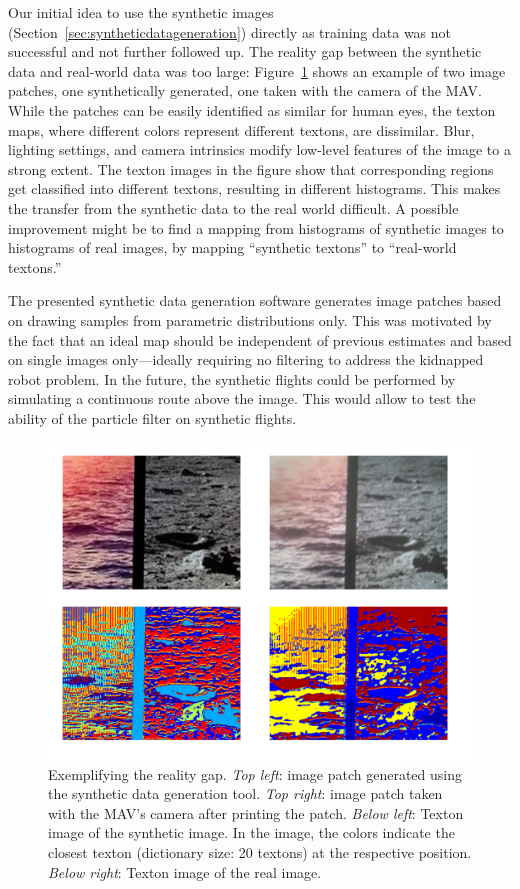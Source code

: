 \documentclass[11pt]{report}
\begin{document}
Our initial idea to use the synthetic images
(Section~\ref{sec:syntheticdatageneration}) directly as training
data was not successful and not further followed up.
The reality gap between the synthetic data and real-world data was too
large: Figure~\ref{fig:realitygap} shows an example of two image
patches, one synthetically generated, one taken with the camera of the
MAV. While the patches can be easily identified as similar for human
eyes, the texton maps, where different colors represent different
textons, are dissimilar. Blur, lighting settings, and camera
intrinsics modify low-level features of the image to a strong extent.
The texton images in the figure show that corresponding regions get
classified into different textons, resulting in different
histograms. This makes the transfer from the synthetic data to the
real world difficult.
A possible improvement might be to find a mapping from histograms of
synthetic images to histograms of real images, by mapping ``synthetic
textons'' to ``real-world textons.''

The presented synthetic data generation software generates image
patches based on drawing samples from parametric distributions
only. This was motivated by the fact that an ideal map should be
independent of previous estimates and based on single images
only---ideally requiring no filtering to address the kidnapped robot
problem. In the future, the synthetic flights could be performed by
simulating a continuous route above the image. This would allow to
test the ability of the particle filter on synthetic flights.

\begin{figure}[h!]
\begin{center}
\includegraphics[width=0.65\columnwidth]{realitygap}
\caption{{\label{fig:realitygap} Exemplifying the reality
    gap. \emph{Top left}: image patch generated using the synthetic
    data generation tool. \emph{Top right}: image patch taken with the
    MAV's camera after printing the patch. \emph{Below left}: Texton
    image of the synthetic image. In the image, the colors indicate
    the closest texton (dictionary size: 20 textons) at the respective
    position. \emph{Below right}: Texton image of the real image.  }}
\end{center}
\end{figure}
\end{document}
